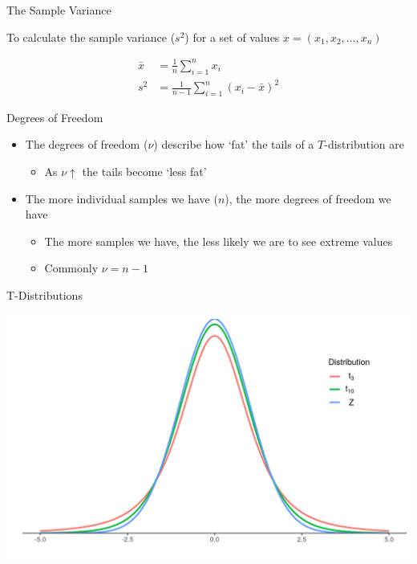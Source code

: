 \documentclass[aspectratio=169,11pt]{beamer}
\begin{document}
\begin{frame}{The Sample Variance}

To calculate the sample variance ($s^2$) for a set of values $x = (x_1, x_2, \ldots, x_n)$

	\begin{align*}
		\bar{x} &= \frac{1}{n}\sum_{i = 1}^n x_i\\
		s^2 &= \frac{1}{n - 1}\sum_{i = 1}^n (x_i - \bar{x})^2
	\end{align*}

\end{frame}

\begin{frame}{Degrees of Freedom}

	\begin{itemize}
		\item The degrees of freedom ($\nu$) describe how `fat' the tails of a $T$-distribution are
		\begin{itemize}
			\item As $\nu \uparrow$ the tails become `less fat'\\[5mm]
		\end{itemize}
		\item The more individual samples we have ($n$), the more degrees of freedom we have
		\begin{itemize}
			\item The more samples we have, the less likely we are to see extreme values
			\item Commonly $\nu = n-1$
		\end{itemize}
	\end{itemize}

\end{frame}

\begin{frame}{T-Distributions}

	\begin{center}
		\includegraphics[scale=0.5]{figures/tvsz.png} 
	\end{center}

\end{frame}
\end{document}

